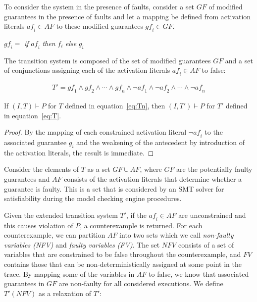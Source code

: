 
To consider the system in the presence of faults, consider a set $GF$ of modified guarantees in the presence of faults and let a mapping be defined from activation literals $\mathit{af}_i \in AF$ to these modified guarantees $\mathit{gf}_i \in GF$. 
\begin{center}
$\mathit{gf}_i =$ \textit{if} $\mathit{af}_i$ \textit{then} $f_i$ \textit{else} $g_i$\\
\label{eq:sigma}
\end{center}

The transition system is composed of the set of modified guarantees $GF$ and a set of conjunctions assigning each of the activation literals $\mathit{af}_i \in AF$ to false: 

\begin{gather}
T' = \mathit{gf}_1 \land \mathit{gf}_2 \land \cdots \land \mathit{gf}_n \land \neg \mathit{af}_1 \land \neg \mathit{af}_2 \land \cdots \land \neg \mathit{af}_n
\label{eq:T}
\end{gather}

\begin{theorem} If $(I,T) \vdash P$ for $T$ defined in equation~\ref{eq:Tn}, then $(I,T') \vdash P$ for $T'$ defined in equation~\ref{eq:T}.
\begin{proof}
By the mapping of each constrained activation literal $\neg \mathit{af}_i$ to the associated guarantee $g_i$ and the weakening of the antecedent by introduction of the activation literals, the result is immediate.
\end{proof}
\end{theorem}

Consider the elements of $T$ as a set $GF \cup AF$, where $GF$ are the potentially faulty guarantees and $AF$ consists of the activation literals that determine whether a guarantee is faulty. This is a set that is considered by an SMT solver for satisfiability during the model checking engine procedures. 

Given the extended transition system $T'$, if the $\mathit{af}_i \in \mathit{AF}$ are unconstrained and this causes violation of $P$, a counterexample is returned. For each counterexample, we can partition $\mathit{AF}$ into two sets which we call {\em non-faulty variables (NFV)} and {\em faulty variables (FV)}.  The set $\mathit{NFV}$ consists of a set of variables that are constrained to be false throughout the counterexample, and $\mathit{FV}$ contains those that can be non-deterministically assigned at some point in the trace. By mapping some of the variables in $\mathit{AF}$ to false, we know that associated guarantees in $\mathit{GF}$ are non-faulty for all considered executions. We define $T'(\mathit{NFV})$ as a relaxation of $T'$:

